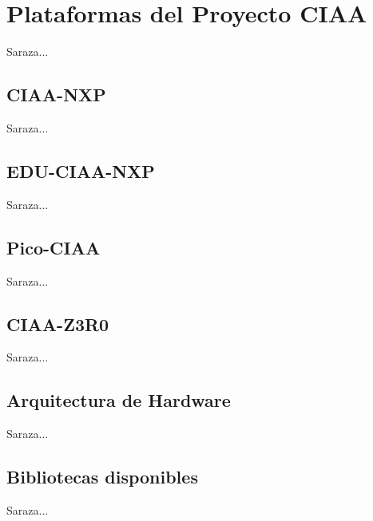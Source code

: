 \section{Plataformas del Proyecto CIAA}
\label{sec:ciaaBoards}

Saraza...

\subsection{CIAA-NXP}

Saraza...

\subsection{EDU-CIAA-NXP}

Saraza...

\subsection{Pico-CIAA}

Saraza...

\subsection{CIAA-Z3R0}

Saraza...

\subsection{Arquitectura de Hardware}

Saraza...

\subsection{Bibliotecas disponibles}

Saraza...
